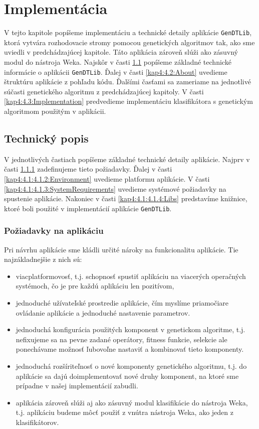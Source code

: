 \chapter{Implementácia}\label{kap4:Implementation}
V tejto kapitole popíšeme implementáciu a technické detaily aplikácie \verb|GenDTLib|, ktorá vytvára rozhodovacie stromy pomocou genetických algoritmov tak, ako sme uviedli v predchádzajúcej kapitole. Táto aplikácia zároveň slúži ako zásuvný modul do nástroja Weka. Najskôr v časti \ref{kap4:4.1:Info} popíšeme základné technické informácie o aplikácii \verb|GenDTLib|. Ďalej v časti \ref{kap4:4.2:About} uvedieme štruktúru aplikácie z pohľadu kódu. Ďalšími časťami sa zameriame na jednotlivé súčasti genetického algoritmu z predchádzajúcej kapitoly. V časti \ref{kap4:4.3:Implementation} predvedieme implementáciu klasifikátora s genetickým algoritmom použitým v aplikácii.
\section{Technický popis}\label{kap4:4.1:Info}
V jednotlivých častiach popíšeme základné technické detaily aplikácie. Najprv v časti \ref{kap4:4.1:4.1.1:Requirements} zadefinujeme tieto požiadavky. Ďalej v časti \ref{kap4:4.1:4.1.2:Environment} uvedieme platformu aplikácie. V časti \ref{kap4:4.1:4.1.3:SystemRequirements} uvedieme systémové požiadavky na spustenie aplikácie. Nakoniec v časti \ref{kap4:4.1:4.1.4:Libs} predstavíme knižnice, ktoré boli použité v implementácií aplikácie \verb|GenDTLib|.

\subsection{Požiadavky na aplikáciu}\label{kap4:4.1:4.1.1:Requirements}
Pri návrhu aplikácie sme kládli určité nároky na funkcionalitu aplikácie. Tie najzákladnejšie z nich sú:
\begin{itemize}
\item viacplatformovosť, t.j. schopnosť spustiť aplikáciu na viacerých operačných systémoch, čo je pre každú aplikáciu len pozitívom,
\item jednoduché užívateľské prostredie aplikácie, čím myslíme priamočiare ovládanie aplikácie a jednoduché nastavenie parametrov.
\item jednoduchá konfigurácia použitých komponent v genetickom algoritme, t.j. nefixujeme sa na pevne zadané operátory, fitness funkcie, selekcie ale ponechávame možnosť ľubovoľne nastaviť a kombinovať tieto komponenty.
\item jednoduchá rozšíriteľnosť o nové komponenty genetického algoritmu, t.j. do aplikácie sa dajú doimplementovať nové druhy komponent, na ktoré sme prípadne v našej implementácií zabudli. 
\item aplikácia zároveň slúži aj ako zásuvný modul klasifikácie do nástroja Weka, t.j. aplikáciu budeme môcť použiť z vnútra nástroja Weka, ako jeden z klasifikátorov. 
\end{itemize}


